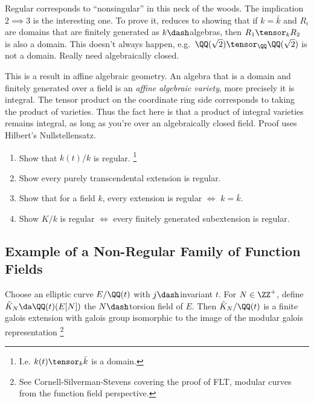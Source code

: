 \begin{remark}

Regular corresponds to ``nonsingular'' in this neck of the woods. The
implication \(2\implies 3\) is the interesting one. To prove it, reduces
to showing that if \(k= \bar k\) and \(R_i\) are domains that are
finitely generated as \(k\dash\)algebras, then \(R_1 \tensor_k R_2\) is
also a domain. This doesn't always happen,
e.g.~\(\QQ(\sqrt{2}) \tensor_\QQ \QQ(\sqrt{2})\) is not a domain. Really
need algebraically closed.

This is a result in affine algebraic geometry. An algebra that is a
domain and finitely generated over a field is an \emph{affine algebraic
variety}, more precisely it is integral. The tensor product on the
coordinate ring side corresponds to taking the product of varieties.
Thus the fact here is that a product of integral varieties remains
integral, as long as you're over an algebraically closed field. Proof
uses Hilbert's Nullstellensatz.

\end{remark}

\begin{exercise}

\envlist

\begin{enumerate}
\def\labelenumi{\alph{enumi}.}
\item
  Show that \(k(t) / k\) is regular. \footnote{I.e.
    \(k(t)\tensor_k \bar k\) is a domain.}
\item
  Show every purely transcendental extension is regular.
\item
  Show that for a field \(k\), every extension is regular \(\iff\)
  \(k = \bar k\).
\item
  Show \(K/k\) is regular \(\iff\) every finitely generated subextension
  is regular.
\end{enumerate}

\end{exercise}

\hypertarget{example-of-a-non-regular-family-of-function-fields}{%
\subsection{Example of a Non-Regular Family of Function
Fields}\label{example-of-a-non-regular-family-of-function-fields}}

Choose an elliptic curve \(E/\QQ(t)\) with \(j\dash\)invariant \(t\).
For \(N\in \ZZ^{+}\), define \(\tilde K_N \da \QQ(t)(E[N])\) the
\(N\dash\)torsion field of \(E\). Then \(\tilde K_N/\QQ(t)\) is a finite
galois extension with galois group isomorphic to the image of the
modular galois representation \footnote{See Cornell-Silverman-Stevens
  covering the proof of FLT, modular curves from the function field
  perspective.}

